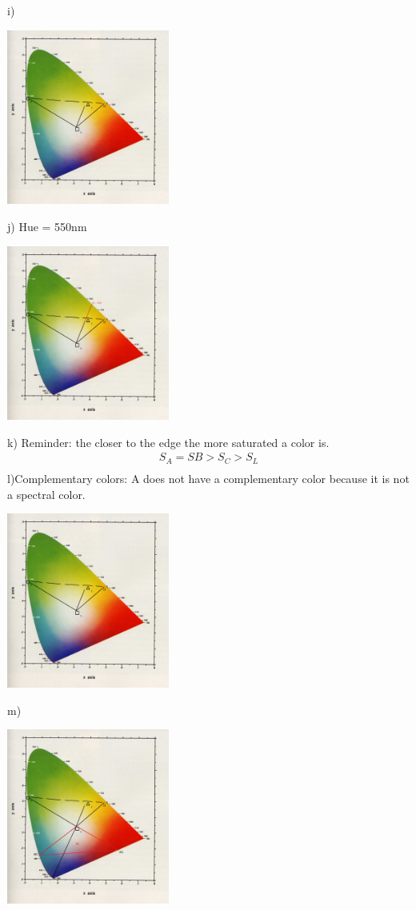 \documentclass{article}
\begin{document}
i)
\begin{center}
\includegraphics[width=0.4\textwidth]{2i.jpg}
\end{center}
j) Hue = 550nm
\begin{center}
\includegraphics[width=0.4\textwidth]{2j.jpg}
\end{center}
k) Reminder: the closer to the edge the more saturated a color is.
\begin{gather}  
S_{A} = S{B} > S_{C} > S_{L} \\
\end{gather}
l)Complementary colors:
A does not have a complementary color because it is not a spectral color.
\begin{center}
\includegraphics[width=0.4\textwidth]{2l.jpg}
\end{center}
m)
\begin{center}
\includegraphics[width=0.4\textwidth]{2m.jpg}
\end{center}
\end{document}

